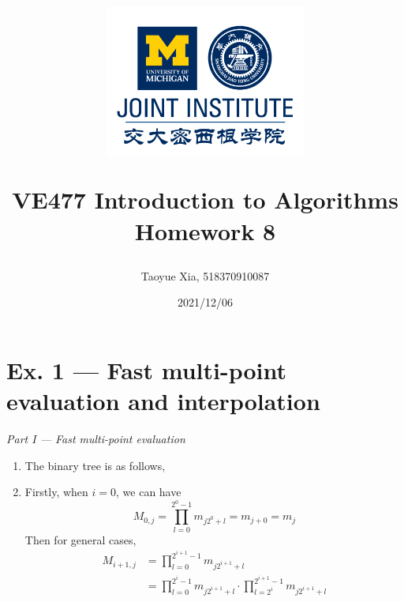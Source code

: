 \documentclass[12pt, a4paper]{article}
\title{
    \begin{figure}[H]
        \centering
        \includegraphics[width=7cm, height=5cm]{AAA.png}
    \end{figure}
    VE477 Introduction to Algorithms\\ 
    Homework 8}
\author{Taoyue Xia, 518370910087}
\date{2021/12/06}
\begin{document}
\maketitle

\newpage

\section*{Ex. 1 --- Fast multi-point evaluation and interpolation}
\begin{center}
    \textit{Part I --- Fast multi-point evaluation}
\end{center}
\begin{enumerate}
    \item The binary tree is as follows,
    
          \begin{center}
          \end{center}
    \item Firstly, when $i = 0$, we can have
          \[M_{0, j} = \prod_{l=0}^{2^0 - 1}m_{j2^0+l} = m_{j+0} = m_{j}\]
          Then for general cases,
          \begin{align*}
              M_{i+1, j} &= \prod_{l=0}^{2^{i+1}-1}m_{j2^{i+1}+l}\\
                         &= \prod_{l=0}^{2^i-1}m_{j2^{i+1}+l} \cdot \prod_{l=2^i}^{2^{i+1}-1}m_{j2^{i+1}+l}\\

\end{align*}
\end{enumerate}
\end{document}
